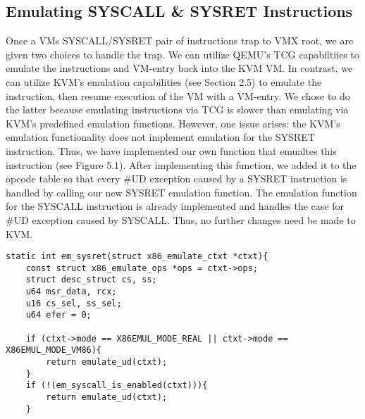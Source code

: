 \documentclass{report}
\begin{document}
\begin{spacing}{1.5}
\subsection{Emulating SYSCALL \& SYSRET Instructions}

{\large
Once a VMs SYSCALL/SYSRET pair of instructions trap to VMX root, we are given two choices to handle the trap. We can utilize QEMU's TCG capabiltiies to emulate the instructions and VM-entry back into the KVM VM. In contrast, we can utilize KVM's emulation capabilities (see Section 2.5) to emulate the instruction, then resume execution of the VM with a VM-entry. We chose to do the latter because emulating instructions via TCG is slower than emulating via KVM's predefined emulation functions. However, one issue arises: the KVM's emulation functionality does not implement emulation for the SYSRET instruction. Thus, we have implemented our own function that emualtes this instruction (see Figure 5.1). After implementing this function, we added it to the opcode table so that every \#UD exception caused by a SYSRET instruction is handled by calling our new SYSRET emulation function. The emulation function for the SYSCALL instruction is already implemented and handles the case for \#UD exception caused by SYSCALL. Thus, no further changes need be made to KVM. 
\newline
}











\begin{lstlisting}[caption={Emulation of SYSRET instruction},captionpos=b]
static int em_sysret(struct x86_emulate_ctxt *ctxt){
    const struct x86_emulate_ops *ops = ctxt->ops;
    struct desc_struct cs, ss;
    u64 msr_data, rcx;
    u16 cs_sel, ss_sel;
    u64 efer = 0;

    if (ctxt->mode == X86EMUL_MODE_REAL || ctxt->mode == X86EMUL_MODE_VM86){
        return emulate_ud(ctxt);
    }
    if (!(em_syscall_is_enabled(ctxt))){
        return emulate_ud(ctxt);
    }
    

\end{lstlisting}
\end{spacing}
\end{document}
